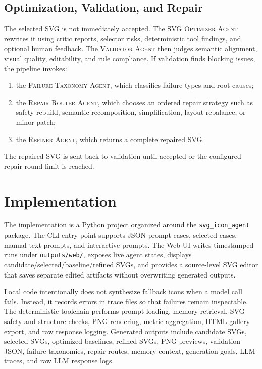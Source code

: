\documentclass[10pt]{article}
\newcommand{\agent}[1]{\textsc{#1}}
\begin{document}
\subsection{Optimization, Validation, and Repair}

The selected SVG is not immediately accepted.
The \agent{SVG Optimizer Agent} rewrites it using critic reports, selector risks, deterministic tool findings, and optional human feedback.
The \agent{Validator Agent} then judges semantic alignment, visual quality, editability, and rule compliance.
If validation finds blocking issues, the pipeline invokes:
\begin{enumerate}[leftmargin=1.5em,itemsep=0.2em]
  \item the \agent{Failure Taxonomy Agent}, which classifies failure types and root causes;
  \item the \agent{Repair Router Agent}, which chooses an ordered repair strategy such as safety rebuild, semantic recomposition, simplification, layout rebalance, or minor patch;
  \item the \agent{Refiner Agent}, which returns a complete repaired SVG.
\end{enumerate}
The repaired SVG is sent back to validation until accepted or the configured repair-round limit is reached.

\section{Implementation}

The implementation is a Python project organized around the \texttt{svg\_icon\_agent} package.
The CLI entry point supports JSON prompt cases, selected cases, manual text prompts, and interactive prompts.
The Web UI writes timestamped runs under \texttt{outputs/web/}, exposes live agent states, displays candidate/selected/baseline/refined SVGs, and provides a source-level SVG editor that saves separate edited artifacts without overwriting generated outputs.

Local code intentionally does not synthesize fallback icons when a model call fails.
Instead, it records errors in trace files so that failures remain inspectable.
The deterministic toolchain performs prompt loading, memory retrieval, SVG safety and structure checks, PNG rendering, metric aggregation, HTML gallery export, and raw response logging.
Generated outputs include candidate SVGs, selected SVGs, optimized baselines, refined SVGs, PNG previews, validation JSON, failure taxonomies, repair routes, memory context, generation goals, LLM traces, and raw LLM response logs.
\end{document}
